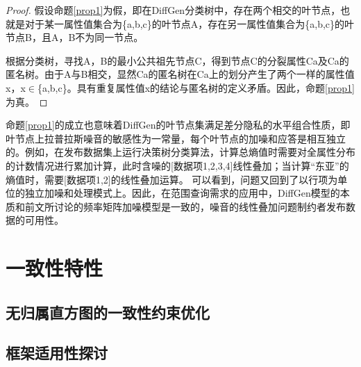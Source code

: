 \begin{proof}
  假设命题\ref{prop1}为假，即在DiffGen分类树中，存在两个相交的叶节点，也就是对于某一属性值集合为\{a,b,c\}的叶节点A，存在另一属性值集合为\{a,b,c\}的叶节点B，且A，B不为同一节点。
  	
  根据分类树，寻找A，B的最小公共祖先节点C，得到节点C的分裂属性Ca及Ca的匿名树。由于A与B相交，显然Ca的匿名树在Ca上的划分产生了两个一样的属性值x，x$\in$\{a,b,c\}。具有重复属性值x的结论与匿名树的定义矛盾。因此，命题\ref{prop1}为真。
\end{proof}

命题\ref{prop1}的成立也意味着DiffGen的叶节点集满足差分隐私的水平组合性质\cite{dpcombination}，即叶节点上拉普拉斯噪音的敏感性为一常量，每个叶节点的加噪和应答是相互独立的。例如，在发布数据集上运行决策树分类算法，计算总熵值时需要对全属性分布的计数情况进行累加计算，此时含噪的[数据项1,2,3,4]线性叠加；当计算“东亚”的熵值时，需要[数据项1,2]的线性叠加运算。
可以看到，问题又回到了以行项为单位的独立加噪和处理模式上。因此，在范围查询需求的应用中，DiffGen模型的本质和前文所讨论的频率矩阵加噪模型是一致的，噪音的线性叠加问题制约者发布数据的可用性。


\section{一致性特性}

\subsection{无归属直方图的一致性约束优化}


\subsection{框架适用性探讨}